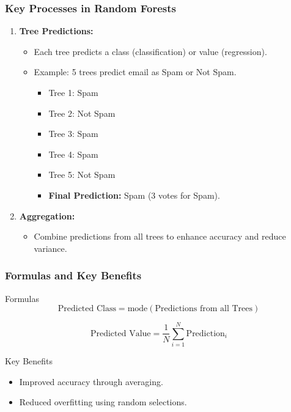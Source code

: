 \documentclass[aspectratio=169]{beamer}
\begin{document}
\begin{frame}[fragile]
    \frametitle{Key Processes in Random Forests}
    \begin{enumerate}[resume]
        \item \textbf{Tree Predictions:}
        \begin{itemize}
            \item Each tree predicts a class (classification) or value (regression).
            \item Example: 5 trees predict email as Spam or Not Spam.
            \begin{itemize}
                \item Tree 1: Spam
                \item Tree 2: Not Spam
                \item Tree 3: Spam
                \item Tree 4: Spam
                \item Tree 5: Not Spam
                \item \textbf{Final Prediction:} Spam (3 votes for Spam).
            \end{itemize}
        \end{itemize}

        \item \textbf{Aggregation:}
        \begin{itemize}
            \item Combine predictions from all trees to enhance accuracy and reduce variance.
        \end{itemize}
    \end{enumerate}
\end{frame}

\begin{frame}[fragile]
    \frametitle{Formulas and Key Benefits}
    \begin{block}{Formulas}
        \begin{equation}
        \text{Predicted Class} = \text{mode}(\text{Predictions from all Trees}) 
        \end{equation}
        
        \begin{equation}
        \text{Predicted Value} = \frac{1}{N} \sum_{i=1}^{N} \text{Prediction}_i
        \end{equation}
    \end{block}

    \begin{block}{Key Benefits}
        \begin{itemize}
            \item Improved accuracy through averaging.
            \item Reduced overfitting using random selections.
        \end{itemize}
    \end{block}
\end{frame}
\end{document}
